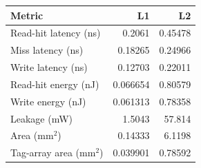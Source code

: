 \begin{tabular}{lrr}\toprule
Metric & L1 & L2 \\ \midrule
Read-hit latency (ns) & 0.2061 & 0.45478 \\
Miss latency (ns) & 0.18265 & 0.24966 \\
Write latency (ns) & 0.12703 & 0.22011 \\
Read-hit energy (nJ) & 0.066654 & 0.80579 \\
Write energy (nJ) & 0.061313 & 0.78358 \\
Leakage (mW) & 1.5043 & 57.814 \\
Area (mm$^2$) & 0.14333 & 6.1198 \\
Tag-array area (mm$^2$) & 0.039901 & 0.78592 \\
\bottomrule\end{tabular}
